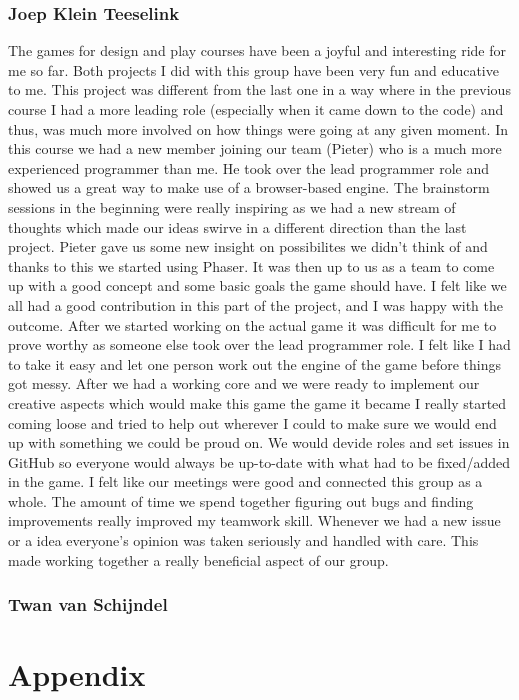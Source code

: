 \documentclass[a4paper,twoside,12pt]{article}
\begin{document}


\subsubsection{Joep Klein Teeselink}

The games for design and play courses have been a joyful and interesting ride for me so far. Both projects I did with this group have been very fun and educative to me. This project was different from the last one in a way where in the previous course I had a more leading role (especially when it came down to the code) and thus, was much more involved on how things were going at any given moment. In this course we had a new member joining our team (Pieter) who is a much more experienced programmer than me. He took over the lead programmer role and showed us a great way to make use of a browser-based engine. The brainstorm sessions in the beginning were really inspiring as we had a new stream of thoughts which made our ideas swirve in a different direction than the last project. Pieter gave us some new insight on possibilites we didn't think of and thanks to this we started using Phaser. It was then up to us as a team to come up with a good concept and some basic goals the game should have. I felt like we all had a good contribution in this part of the project, and I was happy with the outcome. After we started working on the actual game it was difficult for me to prove worthy as someone else took over the lead programmer role. I felt like I had to take it easy and let one person work out the engine of the game before things got messy. After we had a working core and we were ready to implement our creative aspects which would make this game the game it became I really started coming loose and tried to help out wherever I could to make sure we would end up with something we could be proud on. We would devide roles and set issues in GitHub so everyone would always be up-to-date with what had to be fixed/added in the game. I felt like our meetings were good and connected this group as a whole. The amount of time we spend together figuring out bugs and finding improvements really improved my teamwork skill. Whenever we had a new issue or a idea everyone's opinion was taken seriously and handled with care. This made working together a really beneficial aspect of our group.

\subsubsection{Twan van Schijndel}


\section{Appendix}
\end{document}
